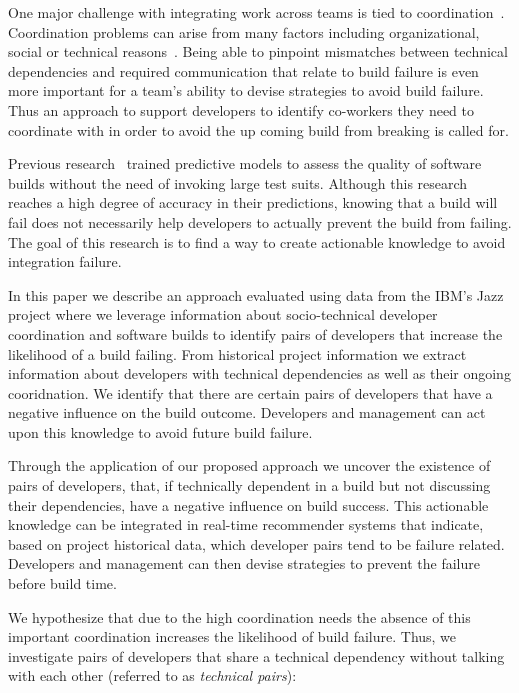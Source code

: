 \documentclass[conference]{IEEEtran}
\begin{document}
One major challenge with integrating work across teams is tied to coordination~\cite{cataldo:esem:2008}.
Coordination problems can arise from many factors including organizational,
social or technical reasons~\cite{herbsleb:icse:1999}. Being able to pinpoint
mismatches between technical dependencies and required communication that
relate to build failure is even more important for a team's
ability to devise strategies to avoid build failure.
Thus an approach to support developers to identify co-workers they need to coordinate with in order to avoid the up coming build from breaking is called for.

Previous
research~\cite{wolf:icse:2009,hassan:ase:2006} trained predictive models to assess the quality of software builds without the need of invoking large test
suits. Although this research
reaches a high degree of accuracy in their predictions, knowing that a
build will fail does not necessarily help developers to actually prevent
the build from failing.
The goal of this research is to find a way to create actionable knowledge to avoid
integration failure.

In this paper we describe an approach evaluated using data from the IBM's Jazz project where we leverage
information about socio-technical developer coordination and software builds to
identify pairs of developers that increase the likelihood of a build failing. From historical project information we extract information about developers with technical dependencies
as well as their ongoing cooridnation.
We identify that there are certain pairs of developers that have a
negative influence on the build outcome. Developers and management can
act upon this knowledge to avoid future build failure.

Through the application of our proposed approach we uncover the existence of pairs of
developers, that, if technically dependent in a build but not discussing their
dependencies, have a negative influence on build success. This
actionable knowledge can be integrated in real-time recommender systems that
indicate, based on project historical data, which developer pairs tend to be
failure related. Developers and management can then devise strategies to
prevent the failure before build time. 


We hypothesize that due to the high coordination needs the absence of this
important coordination increases the likelihood of build failure. 
Thus, we
investigate pairs of developers that share a technical dependency without talking
with each other (referred to as \emph{technical pairs}):
\end{document}
